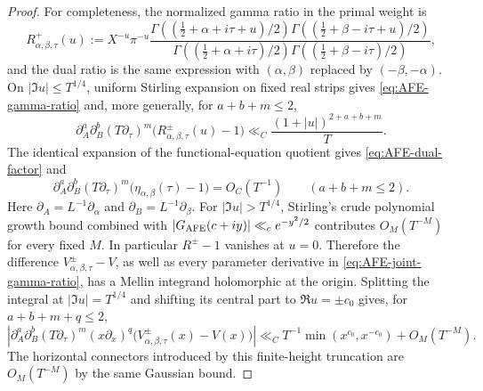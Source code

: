 \begin{proof}
For completeness, the normalized gamma ratio in the primal weight is
\[
R^+_{\alpha,\beta,\tau}(u)
:=X^{-u}\pi^{-u}
\frac{\Gamma((\frac12+\alpha+i\tau+u)/2)
      \Gamma((\frac12+\beta-i\tau+u)/2)}
     {\Gamma((\frac12+\alpha+i\tau)/2)
      \Gamma((\frac12+\beta-i\tau)/2)},
\]
and the dual ratio is the same expression with
$(\alpha,\beta)$ replaced by $(-\beta,-\alpha)$.  On
$|\Im u|\le T^{1/4}$, uniform Stirling expansion on fixed real strips gives
\eqref{eq:AFE-gamma-ratio} and, more generally, for
$a+b+m\le2$,
\begin{equation}
\partial_A^a\partial_B^b(T\partial_\tau)^m
\bigl(R^\pm_{\alpha,\beta,\tau}(u)-1\bigr)
\ll_C\frac{(1+|u|)^{2+a+b+m}}{T}.
\label{eq:AFE-joint-gamma-ratio}
\end{equation}
The identical expansion of the functional-equation quotient gives
\eqref{eq:AFE-dual-factor} and
\begin{equation}
\partial_A^a\partial_B^b(T\partial_\tau)^m
\bigl(\eta_{\alpha,\beta}(\tau)-1\bigr)=O_C(T^{-1})
\qquad(a+b+m\le2).
\label{eq:AFE-joint-dual-factor}
\end{equation}
Here $\partial_A=L^{-1}\partial_\alpha$ and
$\partial_B=L^{-1}\partial_\beta$.  For
$|\Im u|>T^{1/4}$, Stirling's crude polynomial growth bound combined with
$|G_{\rm AFE}(c+iy)|\ll_c e^{-y^2/2}$ contributes $O_M(T^{-M})$ for every
fixed $M$.  In particular $R^\pm-1$ vanishes at $u=0$.  Therefore the
difference $V^\pm_{\alpha,\beta,\tau}-V$, as well as every parameter
derivative in \eqref{eq:AFE-joint-gamma-ratio}, has a Mellin integrand
holomorphic at the origin.  Splitting the integral at
$|\Im u|=T^{1/4}$ and shifting its central part to
$\Re u=\pm c_0$ gives, for $a+b+m+q\le2$,
\begin{equation}
\left|
\partial_A^a\partial_B^b(T\partial_\tau)^m(x\partial_x)^q
\bigl(V^\pm_{\alpha,\beta,\tau}(x)-V(x)\bigr)\right|
\ll_C T^{-1}\min(x^{c_0},x^{-c_0})+O_M(T^{-M}).
\label{eq:AFE-weight-difference}
\end{equation}
The horizontal connectors introduced by this finite-height truncation are
$O_M(T^{-M})$ by the same Gaussian bound.


\end{proof}
